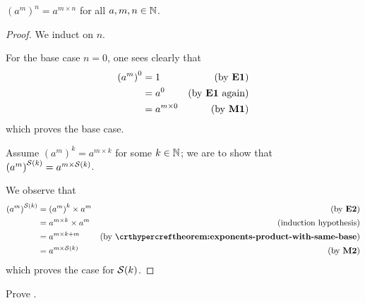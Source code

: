 \begin{theorem}\label{theorem:exponents-power-raised-to-a-power}
    $\left(a^m\right)^n = a^{m\times n}$ for all $a, m, n \in \mathbb{N}$.
\end{theorem}
\begin{proof}
    We induct on $n$.

    For the base case $n = 0$, one sees clearly that
    \begin{align*}
        \left(a^m\right)^0 &= 1 & (\text{by \textbf{E1}})\\
        &= a^0 & (\text{by \textbf{E1} again})\\
        &= a^{m\times 0} & (\text{by \textbf{M1}})
    \end{align*}
    which proves the base case.

    Assume $\left(a^m\right)^k = a^{m\times k}$ for some $k \in \mathbb{N}$; we are to show that $\left(a^m\right)^{\mathcal{S}(k)} = a^{m\times {\mathcal{S}(k)}}$.

    We observe that
    \begin{align*}
        \left(a^m\right)^\Successor{k} &= \left(a^m\right)^k \times a^m & (\text{by \textbf{E2}})\\
        &= a^{m\times k} \times a^m & (\text{induction hypothesis})\\
        &= a^{m\times k + m} & (\text{by \myref{theorem:exponents-product-with-same-base}})\\
        &= a^{m \times \Successor{k}} & (\text{by \textbf{M2}})
    \end{align*}
    which proves the case for ${\mathcal{S}(k)}$.
\end{proof}

\begin{exercise}\label{exercise:exponents-product-to-a-power}
    Prove .
\end{exercise}
